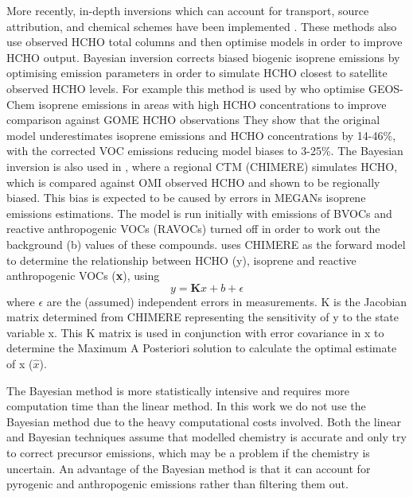       More recently, in-depth inversions which can account for transport, source attribution, and chemical schemes have been implemented \parencite{FortemsCheiney2012}.
      These methods also use observed HCHO total columns and then optimise models in order to improve HCHO output.
      Bayesian inversion corrects biased biogenic isoprene emissions by optimising emission parameters in order to simulate HCHO closest to satellite observed HCHO levels.
      For example this method is used by \textcite{Shim2005} who optimise GEOS-Chem isoprene emissions in areas with high HCHO concentrations to improve comparison against GOME HCHO observations %
      They show that the original model underestimates isoprene emissions and HCHO concentrations by 14-46\%, with the corrected VOC emissions reducing model biases to 3-25\%.
      The Bayesian inversion is also used in \textcite{Curci2010}, where a regional CTM (CHIMERE) simulates HCHO, which is compared against OMI observed HCHO and shown to be regionally biased.
      This bias is expected to be caused by errors in MEGANs isoprene emissions estimations.
      The model is run initially with emissions of BVOCs and reactive anthropogenic VOCs (RAVOCs) turned off in order to work out the background (b) values of these compounds.
      \textcite{Curci2010} uses CHIMERE as the forward model to determine the relationship between HCHO (y), isoprene and reactive anthropogenic VOCs (\textbf{x}), using 
      \begin{equation}
        y=\mathbf{K}x + b + \epsilon
      \end{equation}
      where $\epsilon$ are the (assumed) independent errors in measurements.
      K is the Jacobian matrix determined from CHIMERE representing the sensitivity of y to the state variable x.
      This K matrix is used in conjunction with error covariance in x to determine the Maximum A Posteriori solution to calculate the optimal estimate of x ($\hat{x}$).
    
      The Bayesian method is more statistically intensive and requires more computation time than the linear method. 
      In this work we do not use the Bayesian method due to the heavy computational costs involved.
      Both the linear and Bayesian techniques assume that modelled chemistry is accurate and only try to correct precursor emissions, which may be a problem if the chemistry is uncertain.
      An advantage of the Bayesian method is that it can account for pyrogenic and anthropogenic emissions rather than filtering them out.
  
